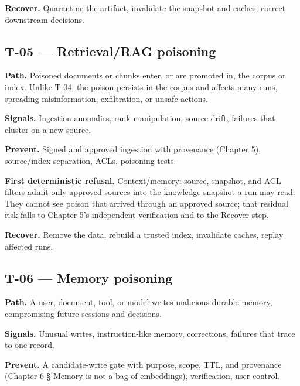 \textbf{Recover.} Quarantine the artifact, invalidate the snapshot and caches, correct downstream decisions.\par

\subsection{T-05 — Retrieval/RAG poisoning}

\textbf{Path.} Poisoned documents or chunks enter, or are promoted in, the corpus or index. Unlike T-04, the poison persists in the corpus and affects many runs, spreading misinformation, exfiltration, or unsafe actions.\par

\textbf{Signals.} Ingestion anomalies, rank manipulation, source drift, failures that cluster on a new source.\par

\textbf{Prevent.} Signed and approved ingestion with provenance (Chapter 5), source/index separation, ACLs, poisoning tests.\par

\textbf{First deterministic refusal.} Context/memory: source, snapshot, and ACL filters admit only approved sources into the knowledge snapshot a run may read. They cannot see poison that arrived through an approved source; that residual risk falls to Chapter 5's independent verification and to the Recover step.\par

\textbf{Recover.} Remove the data, rebuild a trusted index, invalidate caches, replay affected runs.\par

\subsection{T-06 — Memory poisoning}

\textbf{Path.} A user, document, tool, or model writes malicious durable memory, compromising future sessions and decisions.\par

\textbf{Signals.} Unusual writes, instruction-like memory, corrections, failures that trace to one record.\par

\textbf{Prevent.} A candidate-write gate with purpose, scope, TTL, and provenance (Chapter 6 § Memory is not a bag of embeddings), verification, user control.\par


